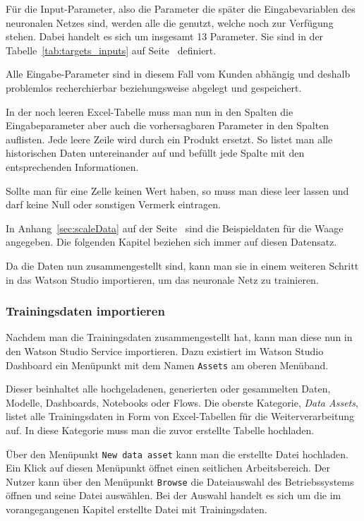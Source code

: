 Für die Input-Parameter, also die Parameter die später die Eingabevariablen des neuronalen Netzes sind, werden alle die
genutzt, welche noch zur Verfügung stehen. Dabei handelt es sich um insgesamt 13 Parameter. Sie sind in der
Tabelle~\ref{tab:targets_inputs} auf Seite~\pageref{tab:targets_inputs} definiert.

Alle Eingabe-Parameter sind in diesem Fall vom Kunden abhängig und deshalb problemlos recherchierbar beziehungsweise
abgelegt und gespeichert.

In der noch leeren Excel-Tabelle muss man nun in den Spalten die Eingabeparameter aber auch die vorhersagbaren Parameter
in den Spalten auflisten. Jede leere Zeile wird durch ein Produkt ersetzt. So listet man alle historischen Daten
untereinander auf und befüllt jede Spalte mit den entsprechenden Informationen.

Sollte man für eine Zelle keinen Wert haben, so muss man diese leer lassen und darf keine Null oder sonstigen Vermerk
eintragen.

In Anhang~\ref{sec:scaleData} auf der Seite~\pageref{sec:scaleData} sind die Beispieldaten für die Waage angegeben. Die
folgenden Kapitel beziehen sich immer auf diesen Datensatz.

Da die Daten nun zusammengestellt sind, kann man sie in einem weiteren Schritt in das Watson Studio importieren, um das
neuronale Netz zu trainieren.

\subsubsection{Trainingsdaten importieren}
Nachdem man die Trainingsdaten zusammengestellt hat, kann man diese nun in den Watson Studio Service importieren. Dazu
existiert im Watson Studio Dashboard ein Menüpunkt mit dem Namen \texttt{Assets} am oberen Menüband.

Dieser beinhaltet alle hochgeladenen, generierten oder gesammelten Daten, Modelle, Dashboards, Notebooks oder Flows. Die
oberste Kategorie, \textit{Data Assets}, listet alle Trainingsdaten in Form von Excel-Tabellen für die
Weiterverarbeitung auf. In diese Kategorie muss man die zuvor erstellte Tabelle hochladen.

Über den Menüpunkt \texttt{New data asset} kann man die erstellte Datei hochladen. Ein Klick auf diesen Menüpunkt öffnet
einen seitlichen Arbeitsbereich. Der Nutzer kann über den Menüpunkt \texttt{Browse} die Dateiauswahl des Betriebssystems
öffnen und seine Datei auswählen. Bei der Auswahl handelt es sich um die im vorangegangenen Kapitel erstellte Datei mit
Trainingsdaten.

